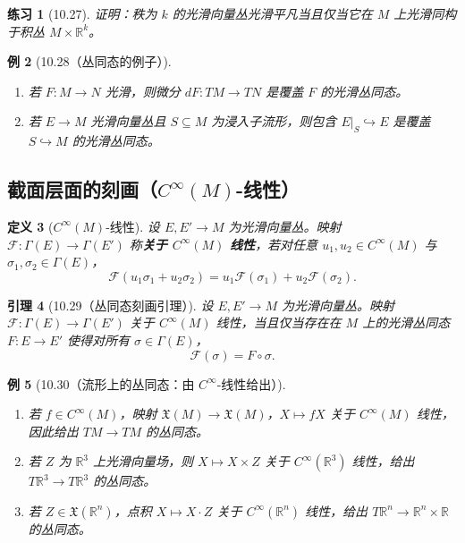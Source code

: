\documentclass[12pt]{article}
\newtheorem{definition}{定义}[section]
\newtheorem{lemma}[definition]{引理}
\newtheorem{example}[definition]{例}
\newtheorem{exercise}[definition]{练习}
\begin{document}
\begin{exercise}[10.27]
证明：秩为 $k$ 的光滑向量丛光滑平凡当且仅当它在 $M$ 上光滑同构于积丛 $M\times\mathbb{R}^k$。
\end{exercise}

\begin{example}[10.28（丛同态的例子）]
\begin{enumerate}[label=(\alph*)]
\item 若 $F:M\to N$ 光滑，则微分 $dF:TM\to TN$ 是覆盖 $F$ 的光滑丛同态。
\item 若 $E\to M$ 光滑向量丛且 $S\subseteq M$ 为浸入子流形，则包含 $E|_S\hookrightarrow E$ 是覆盖 $S\hookrightarrow M$ 的光滑丛同态。
\end{enumerate}
\end{example}

\subsection{截面层面的刻画（$C^\infty(M)$-线性）}

\begin{definition}[$C^\infty(M)$-线性]
设 $E,E'\to M$ 为光滑向量丛。映射 $\mathcal{F}:\Gamma(E)\to \Gamma(E')$ 称\textbf{关于 $C^\infty(M)$ 线性}，若对任意 $u_1,u_2\in C^\infty(M)$ 与 $\sigma_1,\sigma_2\in\Gamma(E)$，
\[
\mathcal{F}(u_1\sigma_1+u_2\sigma_2)=u_1\mathcal{F}(\sigma_1)+u_2\mathcal{F}(\sigma_2).
\]
\end{definition}

\begin{lemma}[10.29（丛同态刻画引理）]
设 $E,E'\to M$ 为光滑向量丛。映射 $\mathcal{F}:\Gamma(E)\to \Gamma(E')$ 关于 $C^\infty(M)$ 线性，当且仅当存在在 $M$ 上的光滑丛同态 $F:E\to E'$ 使得对所有 $\sigma\in\Gamma(E)$，
\[
\mathcal{F}(\sigma)=F\circ \sigma.
\]
\end{lemma}

\begin{example}[10.30（流形上的丛同态：由 $C^\infty$-线性给出）]
\begin{enumerate}[label=(\alph*)]
\item 若 $f\in C^\infty(M)$，映射 $\mathfrak{X}(M)\to\mathfrak{X}(M)$，$X\mapsto fX$ 关于 $C^\infty(M)$ 线性，因此给出 $TM\to TM$ 的丛同态。
\item 若 $Z$ 为 $\mathbb{R}^3$ 上光滑向量场，则 $X\mapsto X\times Z$ 关于 $C^\infty(\mathbb{R}^3)$ 线性，给出 $T\mathbb{R}^3\to T\mathbb{R}^3$ 的丛同态。
\item 若 $Z\in\mathfrak{X}(\mathbb{R}^n)$，点积 $X\mapsto X\cdot Z$ 关于 $C^\infty(\mathbb{R}^n)$ 线性，给出 $T\mathbb{R}^n\to \mathbb{R}^n\times\mathbb{R}$ 的丛同态。
\end{enumerate}
\end{example}
\end{document}
